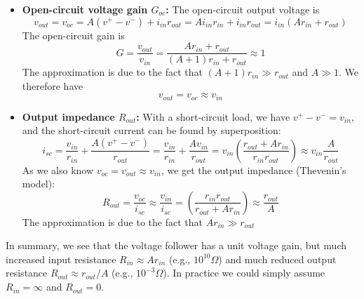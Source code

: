 \documentclass{article}
\begin{document}
\begin{itemize}
\begin{itemize}
  \item {\bf Open-circuit voltage gain $G_{oc}$:} The open-circuit output 
    voltage is
    \begin{equation}
      v_{out}=v_{oc}=A(v^+-v^-)+i_{in}r_{out}=Ai_{in}r_{in}+i_{in}r_{out}
      =i_{in}(Ar_{in}+r_{out})
    \end{equation}
    The open-circuit gain is
    \begin{equation}
      G=\frac{v_{out}}{v_{in}}=\frac{Ar_{in}+r_{out}}{(A+1)r_{in}+r_{out}}\approx 1
    \end{equation}
    The approximation is due to the fact that $(A+1)r_{in}\gg r_{out}$
    and $A\gg 1$. We therefore have
    \begin{equation}
      v_{out}=v_{oc}\approx v_{in}
    \end{equation}
  \item {\bf Output impedance $R_{out}$:} 
    With a short-circuit load, we have $v^+-v^-=v_{in}$, and the 
    short-circuit current can be found by superposition:
    \begin{equation}
      i_{sc}=\frac{v_{in}}{r_{in}}+\frac{A(v^+-v^-)}{r_{out}}
      =\frac{v_{in}}{r_{in}}+\frac{Av_{in}}{r_{out}}
      =v_{in}\left(\frac{r_{out}+Ar_{in}}{r_{in}r_{out}}\right)
      \approx v_{in}\frac{A}{r_{out}}
    \end{equation}
    As we also know $v_{oc}=v_{out}\approx v_{in}$, we get the output impedance
    (Thevenin's model):
    \begin{equation}
      R_{out}=\frac{v_{oc}}{i_{sc}}\approx \frac{v_{in}}{i_{sc}}
      =\left(\frac{r_{in}r_{out}}{r_{out}+Ar_{in}}\right)
      \approx \frac{r_{out}}{A}
    \end{equation}
    The approximation is due to the fact that $Ar_{in}\gg r_{out}$
  \end{itemize}

  In summary, we see that the voltage follower has a unit voltage gain, but
  much increased input resistance $R_{in}\approx A r_{in}$ (e.g., $10^{10}\Omega$)
  and much reduced output resistance $R_{out}\approx r_{out}/A$ (e.g., $10^{-3} \Omega$).
  In practice we could simply assume $R_{in}=\infty$ and $R_{out}=0$.



  \begin{comment}
    \htmladdimg{../figures/VoltageFollowerModel.png}


\end{comment}
\end{itemize}
\end{document}

